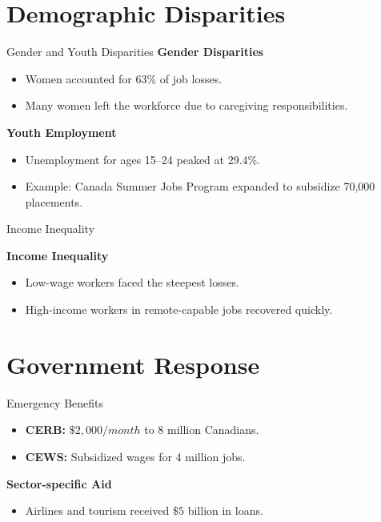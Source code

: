 \documentclass{beamer}
\begin{document}
\section{Demographic Disparities}
\begin{frame}{Gender and Youth Disparities}
    \textbf{Gender Disparities}
    \begin{itemize}
        \item Women accounted for 63\% of job losses.
        \item Many women left the workforce due to caregiving responsibilities.
    \end{itemize}
    \textbf{Youth Employment}
    \begin{itemize}
        \item Unemployment for ages 15–24 peaked at 29.4\%.
        \item Example: Canada Summer Jobs Program expanded to subsidize 70,000 placements.
    \end{itemize}
\end{frame}

\begin{frame}{Income Inequality}

    \textbf{Income Inequality}
    \begin{itemize}
        \item Low-wage workers faced the steepest losses.
        \item High-income workers in remote-capable jobs recovered quickly.
    \end{itemize}
\end{frame}

\section{Government Response}
\begin{frame}{Emergency Benefits}
    \begin{itemize}
        \item \textbf{CERB:} $\$2,000/month$ to 8 million Canadians.
        \item \textbf{CEWS:} Subsidized wages for 4 million jobs.
    \end{itemize}
    \textbf{Sector-specific Aid}
    \begin{itemize}
        \item Airlines and tourism received $\$5$ billion in loans.
    \end{itemize}
\end{frame}
\end{document}
